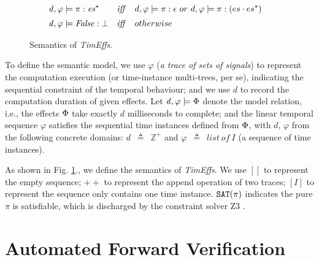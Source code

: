 \documentclass[acmsmall,10pt,review]{acmart}
\newcommand{\es}{\textcolor{black}{\ensuremath{{es}}}}
\newcommand{\timedEffects}{\emph{TimEffs}}
\newcommand{\effect}{\textcolor{black}{\ensuremath{\mathrm{\Phi}}}}
\newcommand\pure[1]{ \textcolor{black}{#1}}
\newcommand{\code}[1]{{\tt{\ensuremath{\m{#1}}}}}
\newcommand{\esn}[2]{\ensuremath{#1^{#2}}}
\newcommand{\empt}{\textcolor{black}{\ensuremath{\epsilon}}}
\newcommand{\m}{\mathit}
\def\defeq{\ensuremath{\,\triangleq}}
\newcommand\figref[1]{Fig. \textcolor{black}{\ref{#1}}.}
\begin{document}
{\begin{figure}[ht]
\begin{align*}
\\[0.2em]
&\code{d,  \varphi \models \pi : \esn{\es}{\star}  }  
&\m{iff}\quad 
&d, \varphi \models \pi :  \empt \ or \ 
d, \varphi \models \pi :  (\es \cdot \esn{\es}{\star} ) 
 \\[0.2em]
& \code{d, \varphi \models False : \bot }  
&\m{iff}\quad 
&   otherwise
\end{align*}
    \vspace{-3mm}
\caption{Semantics of \timedEffects.}
\label{fig:Sementic}
  \vspace{-1mm}
\end{figure}


To define the semantic model, 
we use \code{\varphi} (\emph{a trace of sets of signals})  to represent the computation execution (or time-instance multi-trees, per se), indicating the sequential constraint of the temporal behaviour; and we use \code{d} to record the computation duration of given effects. 
Let \code{d, \varphi \models \effect} denote the model relation, i.e., 
the effects \code{\effect} take exactly \code{d} milliseconds to complete; and 
the linear temporal sequence \code{\varphi} satisfies the sequential time  instances defined from \code{\effect}, with \code{d}, \code{\varphi} from the following concrete domains: \code{d}  {\defeq}\  \code{\mathbb{Z^+}} and \code{\varphi}   {\defeq}\ \code{list\ of\ I} (a sequence of time instances).


As shown in \figref{fig:Sementic}, we define the semantics of \timedEffects. 
We use 
$[]$ to represent the empty sequence;
${+}{+}$ to represent the append operation of two traces;
\code{[I]} to represent the sequence only contains one time instance.
\code{{\tt{SAT}(\pi)} } indicates the pure \code{\pi} is satisfiable, which is discharged by the constraint solver Z3 \cite{de2008z3}.  






\section{Automated Forward Verification}\label{sec:Verification}




}
\end{document}
